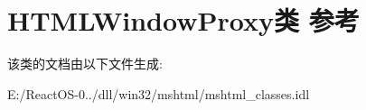 \hypertarget{class_h_t_m_l_window_proxy}{}\section{H\+T\+M\+L\+Window\+Proxy类 参考}
\label{class_h_t_m_l_window_proxy}


该类的文档由以下文件生成\+:\begin{DoxyCompactItemize}
\item 
E\+:/\+React\+O\+S-\/0../dll/win32/mshtml/mshtml\+\_\+classes.\+idl\end{DoxyCompactItemize}
